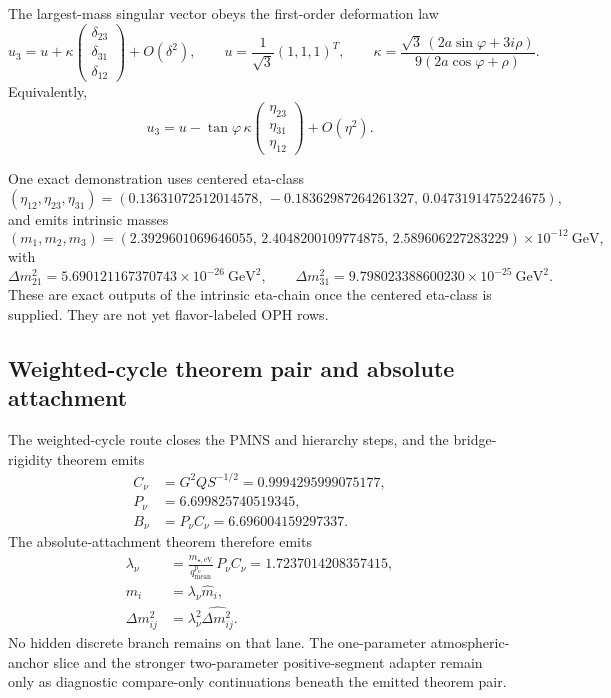 \documentclass[11pt]{article}
\begin{document}
The largest-mass singular vector obeys the first-order deformation law
\[
u_3=
u+
\kappa
\begin{pmatrix}
\delta_{23}\\
\delta_{31}\\
\delta_{12}
\end{pmatrix}
+O(\delta^2),
\qquad
u=\frac1{\sqrt3}(1,1,1)^T,
\qquad
\kappa=
\frac{\sqrt3\,(2a\sin\varphi+3i\rho)}
 {9(2a\cos\varphi+\rho)}.
\]
Equivalently,
\[
u_3=
u-
\tan\varphi\,\kappa
\begin{pmatrix}
\eta_{23}\\
\eta_{31}\\
\eta_{12}
\end{pmatrix}
+O(\eta^2).
\]

One exact demonstration uses centered eta-class
\[
(\eta_{12},\eta_{23},\eta_{31})
=
(0.13631072512014578,\,-0.18362987264261327,\,0.0473191475224675),
\]
and emits intrinsic masses
\[
(m_1,m_2,m_3)=
(2.3929601069646055,\,
2.4048200109774875,\,
2.589606227283229)\times10^{-12}\ \mathrm{GeV},
\]
with
\[
\Delta m_{21}^2 = 5.690121167370743\times10^{-26}\ \mathrm{GeV}^2,
\qquad
\Delta m_{31}^2 = 9.798023388600230\times10^{-25}\ \mathrm{GeV}^2.
\]
These are exact outputs of the intrinsic eta-chain once the centered eta-class is supplied. They
are not yet flavor-labeled OPH rows.

\subsection{Weighted-cycle theorem pair and absolute attachment}

The weighted-cycle route closes the PMNS and hierarchy steps, and the bridge-rigidity theorem
emits
\[
\begin{aligned}
C_\nu&=G^2Q S^{-1/2}=0.9994295999075177,\\
P_\nu&=6.699825740519345,\\
B_\nu&=P_\nu C_\nu=6.696004159297337.
\end{aligned}
\]
The absolute-attachment theorem therefore emits
\[
\begin{aligned}
\lambda_\nu&=\frac{m_{\star,\mathrm{eV}}}{q_{\mathrm{mean}}^{p_\nu}}\,P_\nu C_\nu=1.7237014208357415,\\
m_i&=\lambda_\nu \hat m_i,\\
\Delta m_{ij}^2&=\lambda_\nu^2\widehat{\Delta m_{ij}^2}.
\end{aligned}
\]
No hidden discrete branch remains on that lane. The one-parameter atmospheric-anchor slice and
the stronger two-parameter positive-segment adapter remain only as diagnostic compare-only
continuations beneath the emitted theorem pair.
\end{document}
